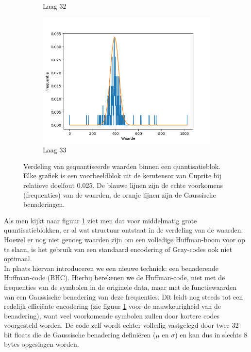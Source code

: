 \begin{itemize}
\begin{figure}[H]
\begin{subfigure}{.44\textwidth}
  \caption{Laag 32}
\end{subfigure}
\begin{subfigure}{.44\textwidth}
  \centering
  \includegraphics[width=0.9\linewidth]{images/distribution_quantized_values_layer_33.png}
  \caption{Laag 33}
\end{subfigure}
\caption{Verdeling van gequantiseerde waarden binnen een quantisatieblok. Elke grafiek is een voorbeeldblok uit de kerntensor van Cuprite bij relatieve doelfout 0.025. De blauwe lijnen zijn de echte voorkomens (frequenties) van de waarden, de oranje lijnen zijn de Gaussische benaderingen.}
\label{fig:distribution-quantized-values}
\end{figure}

Als men kijkt naar figuur \ref{fig:distribution-quantized-values} ziet men dat voor middelmatig grote quantisatieblokken, er al wat structuur ontstaat in de verdeling van de waarden. Hoewel er nog niet genoeg waarden zijn om een volledige Huffman-boom voor op te slaan, is het gebruik van een standaard encodering of Gray-codes ook niet optimaal.\\

In plaats hiervan introduceren we een nieuwe techniek: een benaderende Huffman-code (BHC). Hierbij berekenen we de Huffman-code, niet met de frequenties van de symbolen in de originele data, maar met de functiewaarden van een Gaussische benadering van deze frequenties. Dit leidt nog steeds tot een redelijk effici\"ente encodering (zie figuur \ref{fig:distribution-quantized-values} voor de nauwkeurigheid van de benadering), want veel voorkomende symbolen zullen door kortere codes voorgesteld worden. De code zelf wordt echter volledig vastgelegd door twee 32-bit floats die de Gaussische benadering defini\"eren ($\mu$ en $\sigma$) en kan dus in slechts 8 bytes opgeslagen worden.\\


\end{itemize}
